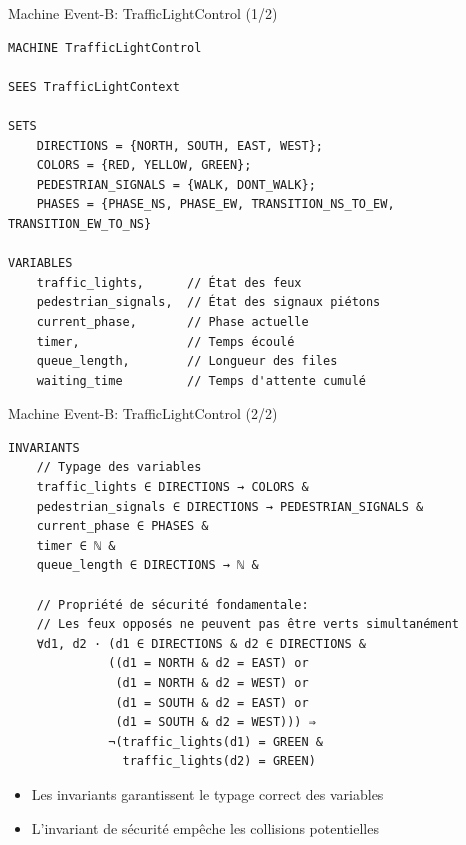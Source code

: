 \begin{frame}[fragile]{Machine Event-B: TrafficLightControl (1/2)}
  \begin{lstlisting}[style=EventB]
MACHINE TrafficLightControl

SEES TrafficLightContext

SETS
    DIRECTIONS = {NORTH, SOUTH, EAST, WEST};
    COLORS = {RED, YELLOW, GREEN};
    PEDESTRIAN_SIGNALS = {WALK, DONT_WALK};
    PHASES = {PHASE_NS, PHASE_EW, TRANSITION_NS_TO_EW, TRANSITION_EW_TO_NS}

VARIABLES
    traffic_lights,      // État des feux
    pedestrian_signals,  // État des signaux piétons
    current_phase,       // Phase actuelle
    timer,               // Temps écoulé
    queue_length,        // Longueur des files
    waiting_time         // Temps d'attente cumulé
  \end{lstlisting}
\end{frame}

\begin{frame}[fragile]{Machine Event-B: TrafficLightControl (2/2)}
  \begin{lstlisting}[style=EventB]
INVARIANTS
    // Typage des variables
    traffic_lights ∈ DIRECTIONS → COLORS &
    pedestrian_signals ∈ DIRECTIONS → PEDESTRIAN_SIGNALS &
    current_phase ∈ PHASES &
    timer ∈ ℕ &
    queue_length ∈ DIRECTIONS → ℕ &
    
    // Propriété de sécurité fondamentale:
    // Les feux opposés ne peuvent pas être verts simultanément
    ∀d1, d2 · (d1 ∈ DIRECTIONS & d2 ∈ DIRECTIONS & 
              ((d1 = NORTH & d2 = EAST) or 
               (d1 = NORTH & d2 = WEST) or
               (d1 = SOUTH & d2 = EAST) or 
               (d1 = SOUTH & d2 = WEST))) ⇒
              ¬(traffic_lights(d1) = GREEN & 
                traffic_lights(d2) = GREEN)
  \end{lstlisting}
  
  \begin{itemize}
    \item Les invariants garantissent le typage correct des variables
    \item L'invariant de sécurité empêche les collisions potentielles
  \end{itemize}
\end{frame}
